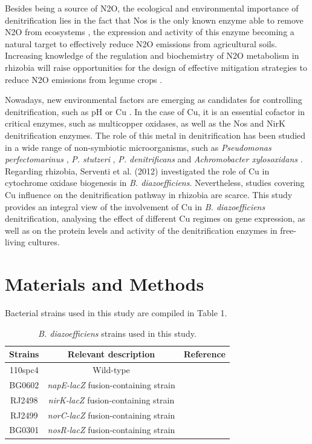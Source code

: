 \documentclass[12pt]{article}
\begin{document}
Besides being a source of N2O, the ecological and environmental importance of denitrification
lies in the fact that Nos is the only known enzyme able to remove N2O from
ecosystems \cite{richardson2009mitigating}, the expression and activity of this enzyme becoming a natural target to effectively reduce N2O emissions from agricultural soils. Increasing knowledge of the regulation
and biochemistry of N2O metabolism in rhizobia will raise opportunities for the design of effective mitigation strategies to reduce N2O emissions from legume crops \cite{bakken2017sources}.

Nowadays, new environmental factors are emerging as candidates for controlling
denitrification, such as pH \cite{carreira2020effect}\cite{olaya2021effect} or Cu \cite{black2016influence}. In the case of Cu, it is an essential cofactor in
critical enzymes, such as multicopper oxidases, as well as the Nos and NirK denitrification
enzymes. The role of this metal in denitrification has been studied in a wide range of
non-symbiotic microorganisms, such as {\em Pseudomonas perfectomarinus} \cite{matsubara1982modulation}, {\em P. stutzeri} \cite{black2016influence},
{\em P. denitrificans} \cite{felgate2012impact}\cite{sullivan2013copper} and {\em Achromobacter xylosoxidans} \cite{felgate2012impact}. Regarding rhizobia, Serventi et al.
(2012) \cite{serventi2012copper} investigated the role of Cu in cytochrome oxidase biogenesis in {\em B. diazoefficiens}.
Nevertheless, studies covering Cu influence on the denitrification pathway in rhizobia are
scarce. This study provides an integral view of the involvement of Cu in {\em B. diazoefficiens}
denitrification, analysing the effect of different Cu regimes on gene expression, as well as
on the protein levels and activity of the denitrification enzymes in free-living cultures.

\section{Materials and Methods}
Bacterial strains used in this study are compiled in Table 1. 

\begin{table}[h!]
\centering
\caption{{\em B. diazoefficiens} strains used in this study.}
\begin{tabular}{|c|c|c|}
\hline
\textbf{Strains} & \textbf{Relevant description} & \textbf{Reference} \\
\hline
110spc4 & Wild-type & \cite{regensburger1983rna} \\
\hline
BG0602 & {\em napE-lacZ} fusion-containing strain & \cite{robles2006bradyrhizobium} \\
\hline
RJ2498 & {\em nirK-lacZ} fusion-containing strain & \cite{mesa2003bradyrhizobium} \\
\hline
RJ2499 & {\em norC-lacZ} fusion-containing strain & \cite{mesa2003bradyrhizobium} \\
\hline
BG0301 & {\em nosR-lacZ} fusion-containing strain & \cite{torres2017fixk2}\\
\hline
\end{tabular}
\label{tab:table1}
\end{table}
\end{document}
